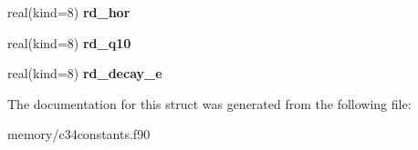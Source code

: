 \begin{DoxyCompactItemize}
\item 
\hypertarget{structc34constants_1_1farq__consts_aed74b55c0daee2fe235e1f948dac1a93}{
real(kind=8) {\bfseries rd\_\-hor}}
\label{structc34constants_1_1farq__consts_aed74b55c0daee2fe235e1f948dac1a93}

\item 
\hypertarget{structc34constants_1_1farq__consts_a4bb81d3f16d5f934ce4c07c1a47ad13f}{
real(kind=8) {\bfseries rd\_\-q10}}
\label{structc34constants_1_1farq__consts_a4bb81d3f16d5f934ce4c07c1a47ad13f}

\item 
\hypertarget{structc34constants_1_1farq__consts_a3ff8dd1a8307cc3da9f1e082c0abd2f7}{
real(kind=8) {\bfseries rd\_\-decay\_\-e}}
\label{structc34constants_1_1farq__consts_a3ff8dd1a8307cc3da9f1e082c0abd2f7}

\end{DoxyCompactItemize}


The documentation for this struct was generated from the following file:\begin{DoxyCompactItemize}
\item 
memory/c34constants.f90\end{DoxyCompactItemize}
